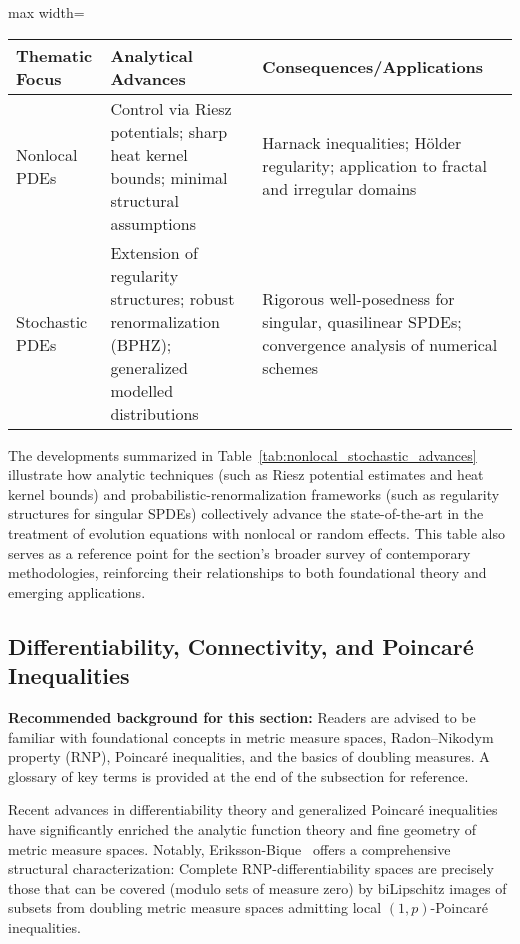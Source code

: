 \documentclass[sigconf]{acmart}
\begin{document}
\begin{table*}[htbp]
\centering
\caption{Core Advances in Nonlocal and Stochastic PDE Analysis}
\label{tab:nonlocal_stochastic_advances}
\begin{adjustbox}{max width=\textwidth}
\begin{tabular}{lll}
\toprule
\textbf{Thematic Focus} & \textbf{Analytical Advances} & \textbf{Consequences/Applications} \\
\midrule
Nonlocal PDEs & Control via Riesz potentials; sharp heat kernel bounds; minimal structural assumptions & Harnack inequalities; Hölder regularity; application to fractal and irregular domains \\
Stochastic PDEs & Extension of regularity structures; robust renormalization (BPHZ); generalized modelled distributions & Rigorous well-posedness for singular, quasilinear SPDEs; convergence analysis of numerical schemes \\
\bottomrule
\end{tabular}
\end{adjustbox}
\end{table*}

The developments summarized in Table~\ref{tab:nonlocal_stochastic_advances} illustrate how analytic techniques (such as Riesz potential estimates and heat kernel bounds) and probabilistic-renormalization frameworks (such as regularity structures for singular SPDEs) collectively advance the state-of-the-art in the treatment of evolution equations with nonlocal or random effects. This table also serves as a reference point for the section's broader survey of contemporary methodologies, reinforcing their relationships to both foundational theory and emerging applications.

\subsection{Differentiability, Connectivity, and Poincaré Inequalities}

\textbf{Recommended background for this section:} Readers are advised to be familiar with foundational concepts in metric measure spaces, Radon–Nikodym property (RNP), Poincaré inequalities, and the basics of doubling measures. A glossary of key terms is provided at the end of the subsection for reference.

Recent advances in differentiability theory and generalized Poincaré inequalities have significantly enriched the analytic function theory and fine geometry of metric measure spaces. Notably, Eriksson-Bique~\cite{ref93} offers a comprehensive structural characterization: Complete RNP-differentiability spaces are precisely those that can be covered (modulo sets of measure zero) by biLipschitz images of subsets from doubling metric measure spaces admitting local $(1,p)$-Poincaré inequalities. 
\end{document}
